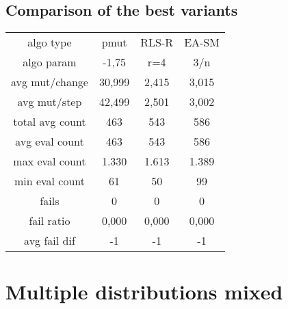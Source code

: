 \subsection{Comparison of the best variants}

\begin{tabular}[h]{cccc}
algo type&            pmut&    RLS-R&    EA-SM\\
algo param&          -1,75&      r=4&      3/n\\
avg mut/change&     30,999&    2,415&    3,015\\
avg mut/step&       42,499&    2,501&    3,002\\
\hline
total avg count&       463&      543&      586\\
avg eval count&        463&      543&      586\\
max eval count&      1.330&    1.613&    1.389\\
min eval count&         61&       50&       99\\
\hline
fails&                   0&        0&        0\\
fail ratio&          0,000&    0,000&    0,000\\
avg fail dif&           -1&       -1&       -1\\
\end{tabular}

\section{Multiple distributions mixed}


